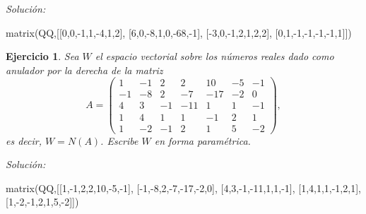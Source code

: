 \documentclass{amsart}
\newtheorem{ejer}{Ejercicio}
\begin{document}
{\it Soluci\'on:}

\begin{sageblock}
matrix(QQ,[[0,0,-1,1,-4,1,2],
[6,0,-8,1,0,-68,-1],
[-3,0,-1,2,1,2,2],
[0,1,-1,-1,-1,-1,1]])
\end{sageblock}



\begin{ejer} Sea $W$ el espacio vectorial sobre los números reales dado
como anulador por la derecha de la matriz 
\[A = \left(\begin{array}{rrrrrrr}
1 & -1 & 2 & 2 & 10 & -5 & -1 \\
-1 & -8 & 2 & -7 & -17 & -2 & 0 \\
4 & 3 & -1 & -11 & 1 & 1 & -1 \\
1 & 4 & 1 & 1 & -1 & 2 & 1 \\
1 & -2 & -1 & 2 & 1 & 5 & -2
\end{array}\right),\]
es decir, $W = N(A)$. Escribe $W$ en forma param\'etrica.
\end{ejer}

{\it Soluci\'on:}

\begin{sageblock}
matrix(QQ,[[1,-1,2,2,10,-5,-1],
[-1,-8,2,-7,-17,-2,0],
[4,3,-1,-11,1,1,-1],
[1,4,1,1,-1,2,1],
[1,-2,-1,2,1,5,-2]])
\end{sageblock}

\end{document}
